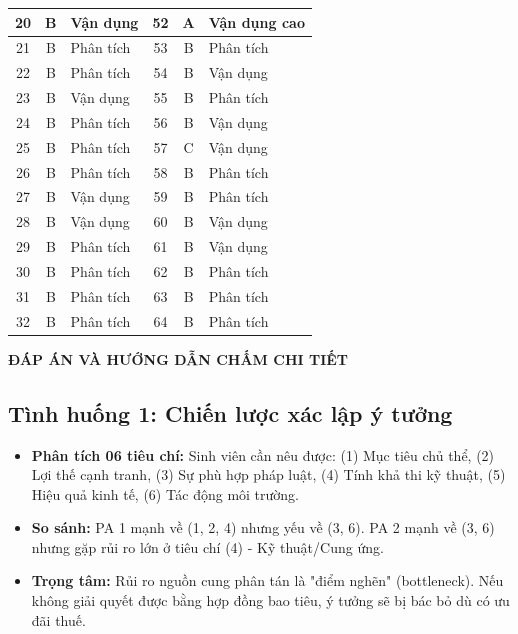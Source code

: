 \begin{longtable}{|c|c|m{3cm}|c|c|m{3cm}|}
20 & B & Vận dụng & 52 & A & Vận dụng cao \\ \hline
21 & B & Phân tích & 53 & B & Phân tích \\ \hline
22 & B & Phân tích & 54 & B & Vận dụng \\ \hline
23 & B & Vận dụng & 55 & B & Phân tích \\ \hline
24 & B & Phân tích & 56 & B & Vận dụng \\ \hline
25 & B & Phân tích & 57 & C & Vận dụng \\ \hline
26 & B & Phân tích & 58 & B & Phân tích \\ \hline
27 & B & Vận dụng & 59 & B & Phân tích \\ \hline
28 & B & Vận dụng & 60 & B & Vận dụng \\ \hline
29 & B & Phân tích & 61 & B & Vận dụng \\ \hline
30 & B & Phân tích & 62 & B & Phân tích \\ \hline
31 & B & Phân tích & 63 & B & Phân tích \\ \hline
32 & B & Phân tích & 64 & B & Phân tích \\ \hline
\end{longtable}

\vspace{1cm}

\newpage

\begin{center}
    \large \textbf{ĐÁP ÁN VÀ HƯỚNG DẪN CHẤM CHI TIẾT}
\end{center}

\subsection{Tình huống 1: Chiến lược xác lập ý tưởng}
\begin{itemize}
    \item \textbf{Phân tích 06 tiêu chí:} Sinh viên cần nêu được: (1) Mục tiêu chủ thể, (2) Lợi thế cạnh tranh, (3) Sự phù hợp pháp luật, (4) Tính khả thi kỹ thuật, (5) Hiệu quả kinh tế, (6) Tác động môi trường.
    \item \textbf{So sánh:} PA 1 mạnh về (1, 2, 4) nhưng yếu về (3, 6). PA 2 mạnh về (3, 6) nhưng gặp rủi ro lớn ở tiêu chí (4) - Kỹ thuật/Cung ứng.
    \item \textbf{Trọng tâm:} Rủi ro nguồn cung phân tán là "điểm nghẽn" (bottleneck). Nếu không giải quyết được bằng hợp đồng bao tiêu, ý tưởng sẽ bị bác bỏ dù có ưu đãi thuế.
\end{itemize}

